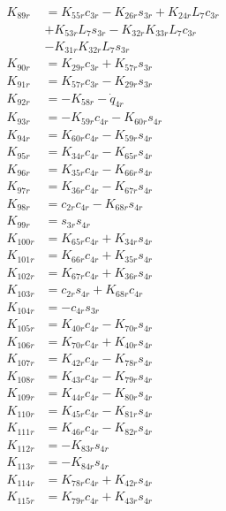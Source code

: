 \begin{multicols}{2}
\begin{align}
K_{89r} &= K_{55r}c_{3r} - K_{26r}s_{3r} + K_{24r}L_7c_{3r}  \nonumber \\
&+ K_{53r}L_7s_{3r} - K_{32r}K_{33r}L_7c_{3r}  \nonumber \\
&- K_{31r}K_{32r}L_7s_{3r} \nonumber \\
K_{90r} &= K_{29r}c_{3r} + K_{57r}s_{3r} \nonumber \\
K_{91r} &= K_{57r}c_{3r} - K_{29r}s_{3r} \nonumber \\
K_{92r} &= - K_{58r} - \dot{q}_{4r} \nonumber \\
K_{93r} &= - K_{59r}c_{4r} - K_{60r}s_{4r} \nonumber \\
K_{94r} &= K_{60r}c_{4r} - K_{59r}s_{4r} \nonumber \\
K_{95r} &= K_{34r}c_{4r} - K_{65r}s_{4r} \nonumber \\
K_{96r} &= K_{35r}c_{4r} - K_{66r}s_{4r} \nonumber \\
K_{97r} &= K_{36r}c_{4r} - K_{67r}s_{4r} \nonumber \\
K_{98r} &= c_{2r}c_{4r} - K_{68r}s_{4r} \nonumber \\
K_{99r} &= s_{3r}s_{4r} \nonumber \\
K_{100r} &= K_{65r}c_{4r} + K_{34r}s_{4r} \nonumber \\
K_{101r} &= K_{66r}c_{4r} + K_{35r}s_{4r} \nonumber \\
K_{102r} &= K_{67r}c_{4r} + K_{36r}s_{4r} \nonumber \\
K_{103r} &= c_{2r}s_{4r} + K_{68r}c_{4r} \nonumber \\
K_{104r} &= -c_{4r}s_{3r} \nonumber \\
K_{105r} &= K_{40r}c_{4r} - K_{70r}s_{4r} \nonumber \\
K_{106r} &= K_{70r}c_{4r} + K_{40r}s_{4r} \nonumber \\
K_{107r} &= K_{42r}c_{4r} - K_{78r}s_{4r} \nonumber \\
K_{108r} &= K_{43r}c_{4r} - K_{79r}s_{4r} \nonumber \\
K_{109r} &= K_{44r}c_{4r} - K_{80r}s_{4r} \nonumber \\
K_{110r} &= K_{45r}c_{4r} - K_{81r}s_{4r} \nonumber \\
K_{111r} &= K_{46r}c_{4r} - K_{82r}s_{4r} \nonumber \\
K_{112r} &= -K_{83r}s_{4r} \nonumber \\
K_{113r} &= -K_{84r}s_{4r} \nonumber \\
K_{114r} &= K_{78r}c_{4r} + K_{42r}s_{4r} \nonumber \\
K_{115r} &= K_{79r}c_{4r} + K_{43r}s_{4r} \nonumber \\

\end{align}
\end{multicols}
